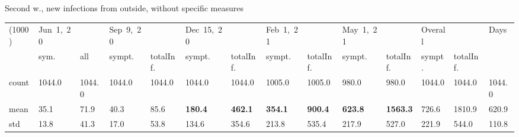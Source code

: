 \documentclass[8pt]{beamer}
\begin{document}
\begin{frame}{Second w., new infections from outside, without specific measures}
\begin{table}[H]
\center
\tiny
\begin{tabular}{p{0.3cm}p{0.3cm}p{0.3cm}p{0.3cm}p{0.3cm}p{0.3cm}p{0.3cm}p{0.3cm}p{0.3cm}p{0.3cm}p{0.3cm}p{0.3cm}p{0.3cm}p{0.4cm}}
\toprule
(1000) &  Jun~1,~20 & &  Sep~9,~20 & & Dec~15,~20 & & Feb~1,~21 & & May~1,~21 & & Overall  & & Days  \\
{} &  sym. &  all &  sympt. &  totalInf. &  sympt. &  totalInf. &  sympt. &  totalInf. &  sympt. &  totalInf. &  sympt. &  totalInf.  & \\
\midrule
count &   1044.0 &                     1044.0 &   1044.0 &                     1044.0 &   1044.0 &                     1044.0 &   1005.0 &                     1005.0 &    980.0 &                      980.0 &              1044.0 &                  1044.0 & 1044.0 \\
mean  &     35.1 &                       71.9 &     40.3 &                       85.6 &    \textbf{180.4} &                      \textbf{462.1} &    \textbf{354.1} &                      \textbf{900.4} &    \textbf{623.8} &                     \textbf{1563.3} &               726.6 &                  1810.9 &  620.9 \\
std   &     13.8 &                       41.3 &     17.0 &                       53.8 &    134.6 &                      354.6 &    213.8 &                      535.4 &    217.9 &                      527.0 &               221.9 &                   544.0 &  110.8 \\
\bottomrule
\end{tabular}

\label{selForceWave2Tab}
\end{table}


\end{frame}
\end{document}
